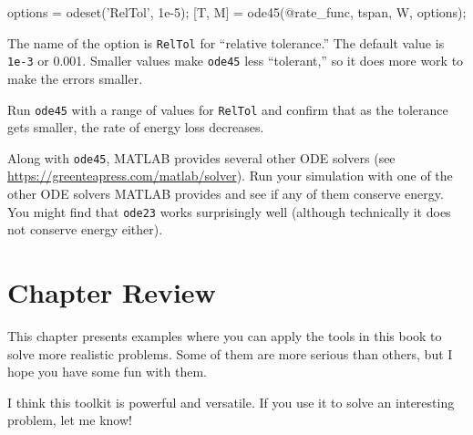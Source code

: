 \begin{code}
options = odeset('RelTol', 1e-5);
[T, M] = ode45(@rate_func, tspan, W, options);
\end{code}

The name of the option is \lstinline{RelTol} for ``relative tolerance.''
The default value is \lstinline{1e-3} or 0.001.  Smaller values
make \lstinline{ode45} less ``tolerant,'' so it does more work to
make the errors smaller.


Run \lstinline{ode45} with a range of values for \lstinline{RelTol} and confirm
that as the tolerance gets smaller, the rate of energy loss
decreases.


Along with \lstinline{ode45}, MATLAB provides several other ODE solvers 
(see \url{https://greenteapress.com/matlab/solver}).
Run your simulation with one of the other ODE solvers MATLAB provides
and see if any of them conserve energy.  You might find that \lstinline{ode23} works surprisingly well (although technically it does not conserve energy either).


\section{Chapter Review}

This chapter presents examples where you can apply the tools in this book to solve more realistic problems.  Some of them are more serious than others, but I hope you have some fun with them.

I think this toolkit is powerful and versatile.  If you use it to solve an interesting problem, let me know!



